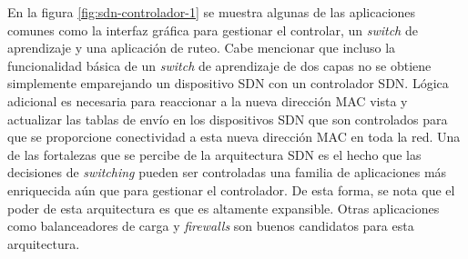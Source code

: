 \documentclass[10pt,journal,compsoc]{IEEEtran}
\begin{document}
En la figura \ref{fig:sdn-controlador-1} se muestra algunas de las aplicaciones comunes como la interfaz gráfica para gestionar el controlar, un \emph{switch} de aprendizaje y una aplicación de ruteo. Cabe mencionar que incluso la funcionalidad básica de un \emph{switch} de aprendizaje de dos capas no se obtiene simplemente emparejando un dispositivo SDN con un controlador SDN. Lógica adicional es necesaria para reaccionar a la nueva dirección MAC vista y actualizar las tablas de envío en los dispositivos SDN que son controlados para que se proporcione conectividad a esta nueva dirección MAC en toda la red. Una de las fortalezas que se percibe de la arquitectura SDN es el hecho que las decisiones de \emph{switching} pueden ser controladas una familia de aplicaciones más enriquecida aún que para gestionar el controlador. De esta forma, se nota que el poder de esta  arquitectura es que es altamente expansible. Otras aplicaciones como balanceadores de carga y \emph{firewalls} son buenos candidatos para esta arquitectura. 
\end{document}
